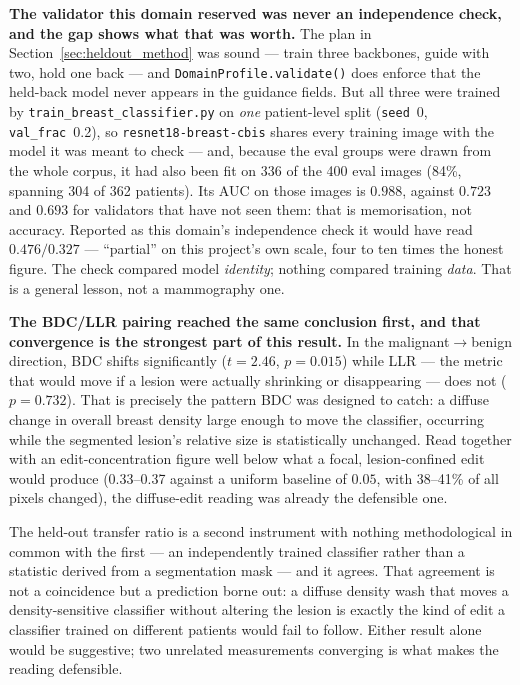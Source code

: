 \textbf{The validator this domain reserved was never an independence check,
and the gap shows what that was worth.} The plan in
Section~\ref{sec:heldout_method} was sound --- train three backbones, guide
with two, hold one back --- and
\texttt{DomainProfile.validate()} does enforce that the held-back model never
appears in the guidance fields. But all three were trained by
\texttt{train\_breast\_classifier.py} on \emph{one} patient-level split
(\texttt{seed}~0, \texttt{val\_frac}~0.2), so
\texttt{resnet18-breast-cbis} shares every training image with the model it
was meant to check --- and, because the eval groups were drawn from the whole
corpus, it had also been fit on 336 of the 400 eval images (84\%, spanning
304 of 362 patients). Its AUC on those images is $0.988$, against $0.723$ and
$0.693$ for validators that have not seen them: that is memorisation, not
accuracy. Reported as this domain's independence check it would have read
$0.476/0.327$ --- ``partial'' on this project's own scale, four to ten times
the honest figure. The check compared model \emph{identity}; nothing compared
training \emph{data}. That is a general lesson, not a mammography one.

\textbf{The BDC/LLR pairing reached the same conclusion first, and that
convergence is the strongest part of this result.} In the
malignant$\to$benign direction, BDC shifts significantly ($t=2.46$,
$p=0.015$) while LLR --- the metric that would move if a lesion were actually
shrinking or disappearing --- does not ($p=0.732$). That is precisely the
pattern BDC was designed to catch: a diffuse change in overall breast density
large enough to move the classifier, occurring while the segmented lesion's
relative size is statistically unchanged. Read together with an
edit-concentration figure well below what a focal, lesion-confined edit would
produce (0.33--0.37 against a uniform baseline of $0.05$, with 38--41\% of
all pixels changed), the diffuse-edit reading was already the defensible one.

The held-out transfer ratio is a second instrument with nothing
methodological in common with the first --- an independently trained
classifier rather than a statistic derived from a segmentation mask --- and
it agrees. That agreement is not a coincidence but a prediction borne out: a
diffuse density wash that moves a density-sensitive classifier without
altering the lesion is exactly the kind of edit a classifier trained on
different patients would fail to follow. Either result alone would be
suggestive; two unrelated measurements converging is what makes the reading
defensible.

